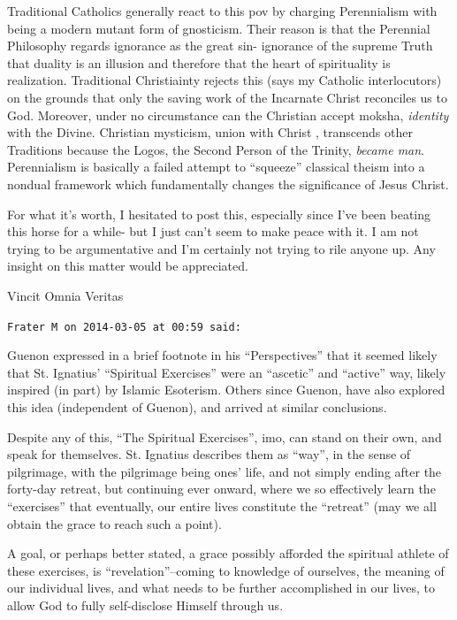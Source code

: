 \begin{footnotesize}
\begin{sffamily}
Traditional Catholics generally react to this pov by charging Perennialism with being a modern mutant form of gnosticism. Their reason is that the Perennial Philosophy regards ignorance as the great sin- ignorance of the supreme Truth that duality is an illusion and therefore that the heart of spirituality is realization. Traditional Christiainty rejects this (says my Catholic interlocutors) on the grounds that only the saving work of the Incarnate Christ reconciles us to God. Moreover, under no circumstance can the Christian accept moksha, \emph{identity} with the Divine. Christian mysticism, union with Christ , transcends other Traditions because the Logos, the Second Person of the Trinity, \emph{became man}. Perennialism is basically a failed attempt to ``squeeze'' classical theism into a nondual framework which fundamentally changes the significance of Jesus Christ.

For what it's worth, I hesitated to post this, especially since I've been beating this horse for a while- but I just can't seem to make peace with it. I am not trying to be argumentative and I'm certainly not trying to rile anyone up. Any insight on this matter would be appreciated.

Vincit Omnia Veritas

\hfill

\texttt{Frater M on 2014-03-05 at 00:59 said:}

Guenon expressed in a brief footnote in his ``Perspectives'' that it seemed likely that St. Ignatius' ``Spiritual Exercises'' were an ``ascetic'' and ``active'' way, likely inspired (in part) by Islamic Esoterism. Others since Guenon, have also explored this idea (independent of Guenon), and arrived at similar conclusions.

Despite any of this, ``The Spiritual Exercises'', imo, can stand on their own, and speak for themselves. St. Ignatius describes them as ``way'', in the sense of pilgrimage, with the pilgrimage being ones' life, and not simply ending after the forty-day retreat, but continuing ever onward, where we so effectively learn the ``exercises'' that eventually, our entire lives constitute the ``retreat'' (may we all obtain the grace to reach such a point).

A goal, or perhaps better stated, a grace possibly afforded the spiritual athlete of these exercises, is ``revelation''--coming to knowledge of ourselves, the meaning of our individual lives, and what needs to be further accomplished in our lives, to allow God to fully self-disclose Himself through us.


\end{sffamily}
\end{footnotesize}
